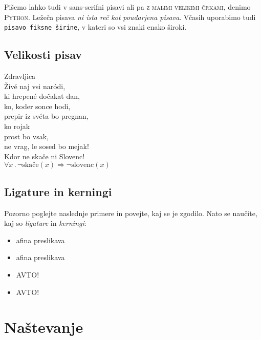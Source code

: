 \documentclass[a4paper]{article}
\begin{document}
Pišemo lahko tudi v \textsf{sans-serifni pisavi} ali pa \textsc{z malimi velikimi črkami},
denimo \textsc{Python}. Ležeča pisava \textsl{ni ista reč kot} \emph{poudarjena pisava}.
Včasih uporabimo tudi \texttt{pisavo fiksne širine}, v kateri so vsi znaki enako široki.


\subsection{Velikosti pisav}

\begin{center}
{\Huge Zdravljica} \\
{\Huge Živé naj vsi naródi,} \\
{\huge ki hrepené dočakat dan,} \\
{\LARGE ko, koder sonce hodi,} \\
{\Large prepir iz svéta bo pregnan,} \\
{\large ko rojak} \\
{\normalsize prost bo vsak,} \\
{\footnotesize ne vrag, le sosed bo mejak!} \\
{\scriptsize Kdor ne skače ni Slovenc!} \\
{\tiny $\forall x \,.\, \lnot\mathrm{skače}(x) \Rightarrow \lnot\mathrm{slovenc}(x)$}
\end{center}


\subsection{Ligature in kerningi}

Pozorno poglejte naslednje primere in povejte, kaj se je zgodilo. Nato se naučite, kaj so
\emph{ligature} in \emph{kerningi}:
%
\begin{itemize}
\item afina preslikava
\item {a}{f}{i}{n}{a} preslikava
\item AVTO!
\item {A}{V}{T}{O}!
\end{itemize}


\section{Naštevanje}
\end{document}
